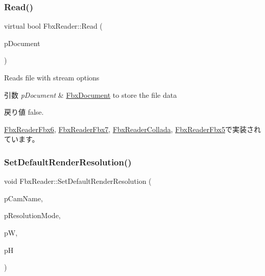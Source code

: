 \mbox{\label{class_fbx_reader_a29941746acc73d7ffd2411a9be9d2525}} 
\subsubsection{\texorpdfstring{Read()}{Read()}}
{\footnotesize\ttfamily virtual bool Fbx\+Reader\+::\+Read (\begin{DoxyParamCaption}\item[{\hyperlink{class_fbx_document}{Fbx\+Document} $\ast$}]{p\+Document }\end{DoxyParamCaption})\hspace{0.3cm}{\ttfamily [pure virtual]}}

Reads file with stream options 
\begin{DoxyParams}{引数}
{\em p\+Document} & \hyperlink{class_fbx_document}{Fbx\+Document} to store the file data \\
\hline
\end{DoxyParams}
\begin{DoxyReturn}{戻り値}
{\ttfamily false}. 
\end{DoxyReturn}


\hyperlink{class_fbx_reader_fbx6_ab16aeaede33ca635a0493069aac4fbea}{Fbx\+Reader\+Fbx6}, \hyperlink{class_fbx_reader_fbx7_a037c53dbae903fd4aafbb942a563f759}{Fbx\+Reader\+Fbx7}, \hyperlink{class_fbx_reader_collada_afbffa96769d22d8e5df25c83d15bd8cb}{Fbx\+Reader\+Collada}, \hyperlink{class_fbx_reader_fbx5_aac75f44d42d473ac88a54c81ec5b1af6}{Fbx\+Reader\+Fbx5}で実装されています。

\mbox{\label{class_fbx_reader_a57209dd75b739a6234bd21212f447215}} 
\subsubsection{\texorpdfstring{Set\+Default\+Render\+Resolution()}{SetDefaultRenderResolution()}}
{\footnotesize\ttfamily void Fbx\+Reader\+::\+Set\+Default\+Render\+Resolution (\begin{DoxyParamCaption}\item[{const char $\ast$}]{p\+Cam\+Name,  }\item[{const char $\ast$}]{p\+Resolution\+Mode,  }\item[{double}]{pW,  }\item[{double}]{pH }\end{DoxyParamCaption})\hspace{0.3cm}{\ttfamily [protected]}}


